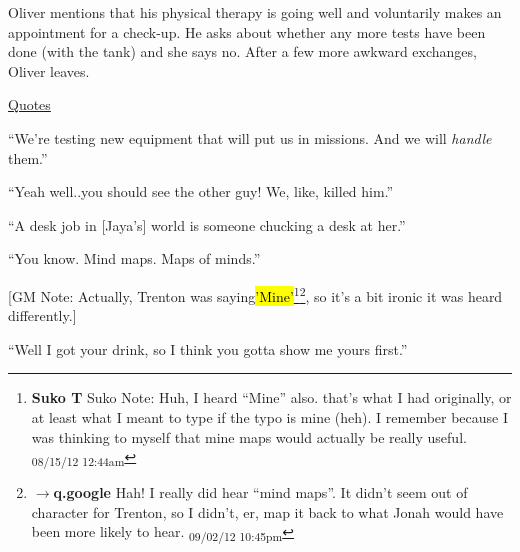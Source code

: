 Oliver mentions that his physical therapy is going well and voluntarily makes an appointment for a check-up.  He asks about whether any more tests have been done (with the tank) and she says no.  After a few more awkward exchanges, Oliver leaves.



\underline{  {\LARGE Quotes }  }



``We're testing new equipment that will put us in missions. And we will \textit{handle }them.''






``Yeah well..you should see the other guy!  We, like, killed him.''




``A desk job in {[}Jaya's{]} world is someone chucking a desk at her.''




``You know.  Mind maps.  Maps of minds.''


{[}GM Note: Actually, Trenton was saying\hl{'Mine'}\footnote{\textbf{Suko T }Suko Note: Huh, I heard ``Mine'' also. that's what I had originally, or at least what I meant to type if the typo is mine (heh).  I remember because I was thinking to myself that mine maps would actually be really useful. \textsubscript{08/15/12 12:44am}}\footnote{$\rightarrow$\textbf{q.google }Hah!  I really did hear ``mind maps''.  It didn't seem out of character for Trenton, so I didn't, er, map it back to what Jonah would have been more likely to hear. \textsubscript{09/02/12 10:45pm}}, so it's a bit ironic it was heard differently.{]}



``Well I got your drink, so I think you gotta show me yours first.''





